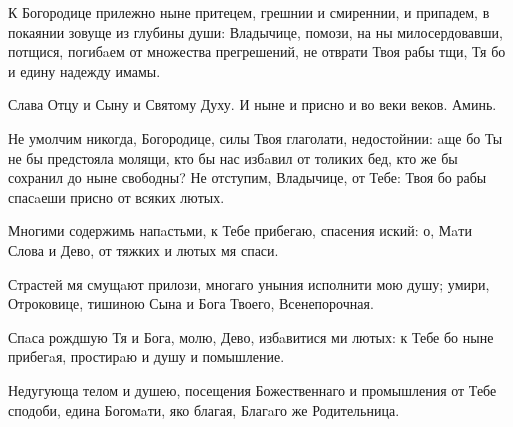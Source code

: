 \begin{mymulticols}





К Богородице прилежно ныне притецем, грешнии и смиреннии, и припадем, в покаянии зовуще из глубины души: Владычице, помози, на ны милосердовавши, потщися, погибaем от множества прегрешений, не отврати Твоя рабы тщи, Тя бо и едину надежду имамы. 

Слава Отцу и Сыну и Святому Духу. И ныне и присно и во веки веков. Аминь.

Не умолчим никогда, Богородице, силы Твоя глаголати, недостойнии: aще бо Ты не бы предстояла молящи, кто бы нас избaвил от толиких бед, кто же бы сохранил до ныне свободны? Не отступим, Владычице, от Тебе: Твоя бо рабы спасaеши присно от всяких лютых.


\PsalmFifty





Многими содержимь напaстьми, к Тебе прибегаю, спасения иский: о, Мaти Слова и Дево, от тяжких и лютых мя спаси.


Страстей мя смущaют прилози, многаго уныния исполнити мою душу; умири, Отроковице, тишиною Сына и Бога Твоего, Всенепорочная.

\slava

Спaса рождшую Тя и Бога, молю, Дево, избaвитися ми лютых: к Тебе бо ныне прибегaя, простирaю и душу и помышление.

\inyne

Недугующа телом и душею, посещения Божественнаго и промышления от Тебе сподоби, едина Богомaти, яко благая, Благaго же Родительница.



\end{mymulticols}
